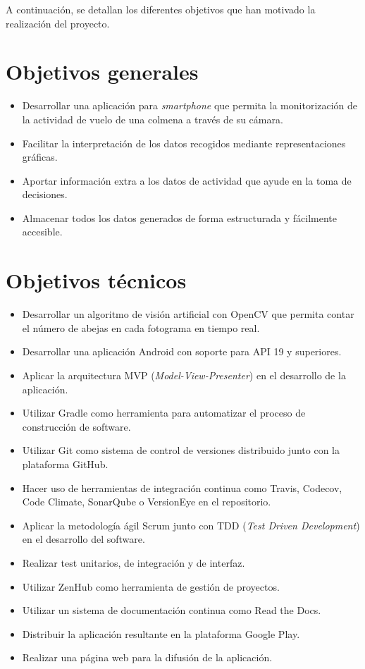 
A continuación, se detallan los diferentes objetivos que han motivado la
realización del proyecto.

\section{Objetivos generales}\label{objetivos-generales}

\begin{itemize}
\tightlist
\item
  Desarrollar una aplicación para \emph{smartphone} que permita la
  monitorización de la actividad de vuelo de una colmena a través de su
  cámara.
\item
  Facilitar la interpretación de los datos recogidos mediante
  representaciones gráficas.
\item
  Aportar información extra a los datos de actividad que ayude en la
  toma de decisiones.
\item
  Almacenar todos los datos generados de forma estructurada y fácilmente
  accesible.
\end{itemize}

\section{Objetivos técnicos}\label{objetivos-tecnicos}

\begin{itemize}
\tightlist
\item
  Desarrollar un algoritmo de visión artificial con OpenCV que permita
  contar el número de abejas en cada fotograma en tiempo real.
\item
  Desarrollar una aplicación Android con soporte para API 19 y
  superiores.
\item
  Aplicar la arquitectura MVP (\emph{Model-View-Presenter}) en el
  desarrollo de la aplicación.
\item
  Utilizar Gradle como herramienta para automatizar el proceso de
  construcción de software.
\item
  Utilizar Git como sistema de control de versiones distribuido junto
  con la plataforma GitHub.
\item
  Hacer uso de herramientas de integración continua como Travis,
  Codecov, Code Climate, SonarQube o VersionEye en el repositorio.
\item
  Aplicar la metodología ágil Scrum junto con TDD (\emph{Test Driven
  Development}) en el desarrollo del software.
\item
  Realizar test unitarios, de integración y de interfaz.
\item
  Utilizar ZenHub como herramienta de gestión de proyectos.
\item
  Utilizar un sistema de documentación continua como Read the Docs.
\item
  Distribuir la aplicación resultante en la plataforma Google Play.
\item
  Realizar una página web para la difusión de la aplicación.
\end{itemize}

